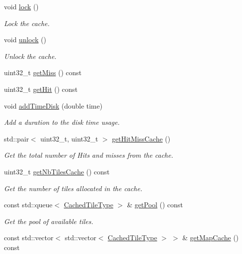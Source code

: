 \begin{DoxyCompactItemize}
void \hyperlink{classfi_1_1FigCache_aa67a984797e38073d2c3a4697b8e472f}{lock} ()
\begin{DoxyCompactList}\small\item\em Lock the cache. \end{DoxyCompactList}\item 
void \hyperlink{classfi_1_1FigCache_af463d23f5dbf6f418e14da2e26774e10}{unlock} ()
\begin{DoxyCompactList}\small\item\em Unlock the cache. \end{DoxyCompactList}\item 
uint32\+\_\+t \hyperlink{classfi_1_1FigCache_a7e66a2834401a655f011e21f90bcdd3a}{get\+Miss} () const
\item 
uint32\+\_\+t \hyperlink{classfi_1_1FigCache_a112e5ccf7834108682982dd4666a9bcb}{get\+Hit} () const
\item 
void \hyperlink{classfi_1_1FigCache_a9cead898e2afc1eb9b9f87cb14cf06c2}{add\+Time\+Disk} (double time)
\begin{DoxyCompactList}\small\item\em Add a duration to the disk time usage. \end{DoxyCompactList}\item 
std\+::pair$<$ uint32\+\_\+t, uint32\+\_\+t $>$ \hyperlink{classfi_1_1FigCache_a90aff6f08938280b32bbe303913673da}{get\+Hit\+Miss\+Cache} ()
\begin{DoxyCompactList}\small\item\em Get the total number of Hits and misses from the cache. \end{DoxyCompactList}\item 
uint32\+\_\+t \hyperlink{classfi_1_1FigCache_ad373ca3169e62437efc7288cf900c096}{get\+Nb\+Tiles\+Cache} () const
\begin{DoxyCompactList}\small\item\em Get the number of tiles allocated in the cache. \end{DoxyCompactList}\item 
const std\+::queue$<$ \hyperlink{classfi_1_1FigCache_a7b9bbc4a832c01c3a461f573445c3c41}{Cached\+Tile\+Type} $>$ \& \hyperlink{classfi_1_1FigCache_a3248a10a2063e2e417203a2d1d8f1f5a}{get\+Pool} () const
\begin{DoxyCompactList}\small\item\em Get the pool of available tiles. \end{DoxyCompactList}\item 
const std\+::vector$<$ std\+::vector$<$ \hyperlink{classfi_1_1FigCache_a7b9bbc4a832c01c3a461f573445c3c41}{Cached\+Tile\+Type} $>$ $>$ \& \hyperlink{classfi_1_1FigCache_a0fd184d36af2622e40cf5d079f23b5b1}{get\+Map\+Cache} () const

\end{DoxyCompactItemize}
